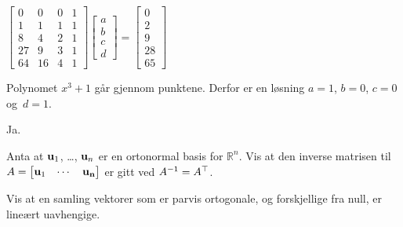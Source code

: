 \begin{losning}

\begin{punkt}
$
\begin{bmatrix}
0 & 0 & 0 & 1\\
1 & 1 & 1 & 1\\
8 & 4 & 2 & 1\\
27 & 9 & 3 & 1\\
64 & 16 & 4 & 1
\end{bmatrix}\begin{bmatrix}
a\\
b\\
c\\
d
\end{bmatrix}=\begin{bmatrix}
0\\
2\\
9\\
28\\
65
\end{bmatrix}$
\end{punkt}

\begin{punkt}
Polynomet $x^3+1$ går gjennom punktene. Derfor er en løsning $a=1$, $b=0$, $c=0$ og~$d=1$.
\end{punkt}

\begin{punkt}
Ja.
\end{punkt}

\end{losning}

%
%


\begin{oppgave}
Anta at $\mathbf{u}_1$, \ldots, $\mathbf{u}_n$ er en ortonormal basis for $\mathbb{R}^n$. Vis at den inverse matrisen til $A=\begin{bmatrix}
\mathbf{u}_1 & \cdots & \mathbf{u_n}
\end{bmatrix}$ er gitt ved $A^{-1}=A^\top$.
\end{oppgave}

\begin{oppgave}
Vis at en samling vektorer som er parvis ortogonale, og forskjellige fra null, er lineært uavhengige.
\end{oppgave}


